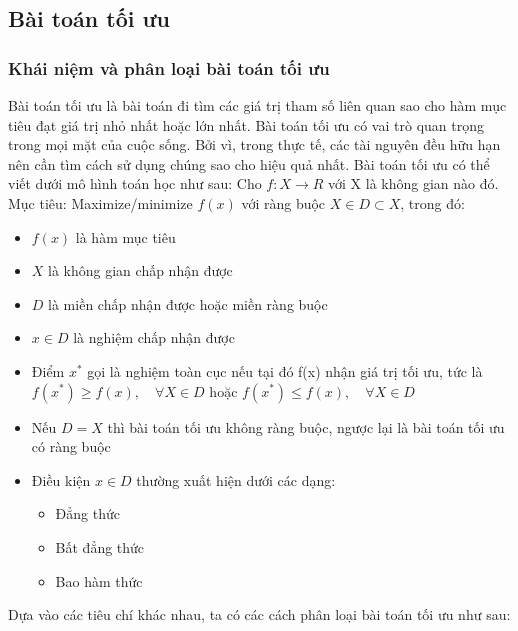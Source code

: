 \documentclass{article}
\begin{document}
\subsection{Bài toán tối ưu}
\subsubsection{Khái niệm và phân loại bài toán tối ưu}
Bài toán tối ưu là bài toán đi tìm các giá trị tham số liên quan sao cho hàm mục tiêu đạt giá trị nhỏ nhất hoặc lớn nhất. Bài toán tối ưu có vai trò quan trọng trong mọi mặt của cuộc sống. Bởi vì, trong thực tế, các tài nguyên đều hữu hạn nên cần tìm cách sử dụng chúng sao cho hiệu quả nhất.
\newline Bài toán tối ưu có thể viết dưới mô hình toán học như sau:
\newline Cho $f: X \rightarrow R $ với X là không gian nào đó. 
\newline Mục tiêu: Maximize/minimize $f(x)$ với ràng buộc $ X \in D  \subset X  $, trong đó:
\begin{itemize}
    \item $f(x)$ là hàm mục tiêu
    \item $X$ là không gian chấp nhận được
    \item $D$ là miền chấp nhận được hoặc miền ràng buộc
    \item $x \in D$ là nghiệm chấp nhận được
    \item Điểm $ x^\ast$ gọi là nghiệm toàn cục nếu  tại đó f(x) nhận giá trị tối ưu, tức là $ f(x^\ast) \geq f(x),  \quad \forall X \in D$ hoặc  $ f(x^\ast) \leq f(x),  \quad \forall X \in D$
    \item Nếu $D = X$ thì bài toán tối ưu không ràng buộc, ngược lại là bài toán tối ưu có ràng buộc
    \item Điều kiện $ x \in D $ thường xuất hiện dưới các dạng:
    \begin{itemize}
        \item Đẳng thức
        \item Bất đẳng thức
        \item Bao hàm thức
    \end{itemize}
\end{itemize}
Dựa vào các tiêu chí khác nhau, ta có các cách phân loại bài toán tối ưu như sau:
\end{document}
